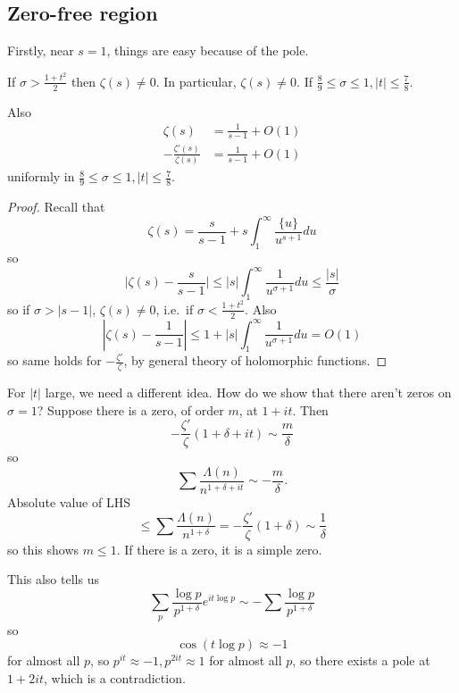 \documentclass[a4paper]{article}
\theoremstyle{definition}
\begin{document}
\subsection{Zero-free region}

Firstly, near \(s = 1\), things are easy because of the pole.

\begin{theorem}
  If \(\sigma > \frac{1 + t^2}{2}\) then \(\zeta(s) \neq 0\). In particular, \(\zeta(s) \neq 0\). If \(\frac{8}{9} \leq \sigma \leq 1, |t| \leq \frac{7}{8}\).

  Also
  \begin{align*}
    \zeta(s) &= \frac{1}{s - 1} + O(1) \\
    - \frac{\zeta'(s)}{\zeta(s)} &= \frac{1}{s - 1} + O(1)
  \end{align*}
  uniformly in \(\frac{8}{9} \leq \sigma \leq 1, |t| \leq \frac{7}{8}\).
\end{theorem}

\begin{proof}
  Recall that
  \[
    \zeta(s) = \frac{s}{s - 1} + s \int_1^\infty \frac{\{u\}}{u^{s + 1}} du
  \]
  so
  \[
    \Big| \zeta(s) - \frac{s}{s - 1} \Big| \leq |s| \int_1^\infty \frac{1}{u^{\sigma + 1}} du \leq \frac{|s|}{\sigma}
    \]
    so if \(\sigma > |s - 1|\), \(\zeta(s) \neq 0\), i.e.\ if \(\sigma < \frac{1 + t^2}{2}\). Also
    \[
      |\zeta(s) - \frac{1}{s - 1}| \leq 1 + |s| \int_1^\infty \frac{1}{u^{\sigma + 1}} du = O(1)
    \]
    so same holds for \(- \frac{\zeta'}{\zeta}\), by general theory of holomorphic functions.
\end{proof}

For \(|t|\) large, we need a different idea. How do we show that there aren't zeros on \(\sigma = 1\)? Suppose there is a zero, of order \(m\), at \(1 + it\). Then
\[
  - \frac{\zeta'}{\zeta} (1 + \delta + it) \sim \frac{m}{\delta}
\]
so
\[
  \sum \frac{\Lambda(n)}{n^{1 + \delta + it}} \sim -\frac{m}{\delta}.
\]
Absolute value of LHS
\[
  \leq \sum \frac{\Lambda(n)}{n^{1 + \delta}}
  = - \frac{\zeta'}{\zeta} (1 + \delta) \sim \frac{1}{\delta}
\]
so this shows \(m \leq 1\). If there is a zero, it is a simple zero.

This also tells us
\[
  \sum_p \frac{\log p}{p^{1 + \delta}} e^{i t \log p} \sim - \sum \frac{\log p}{p^{1 + \delta}}
\]
so
\[
  \cos (t \log p) \approx -1
\]
for almost all \(p\), so \(p^{it} \approx -1, p^{2it} \approx 1\) for almost all \(p\), so there exists a pole at \(1 + 2i t\), which is a contradiction.
\end{document}
